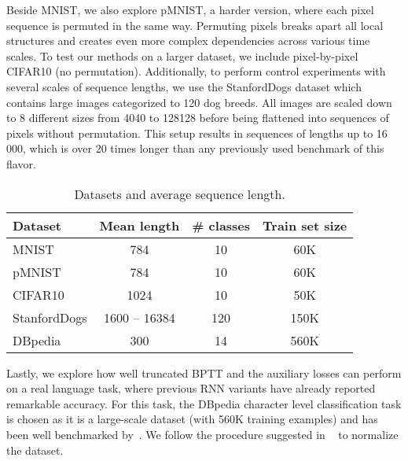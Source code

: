 \documentclass{article}
\begin{document}
Beside MNIST, we also explore pMNIST, a harder version, where each pixel sequence is permuted in the same way. Permuting pixels breaks apart all local structures and creates even more complex dependencies across various time scales. To test our methods on a larger dataset, we include pixel-by-pixel CIFAR10 (no permutation). Additionally, to perform control experiments with several scales of sequence lengths, we use the StanfordDogs dataset \citep{stanforddogs} which contains large images categorized to 120 dog breeds. All images are scaled down to 8 different sizes from 4040 to 128128 before being flattened into sequences of pixels without permutation. This setup results in sequences of lengths up to 16\,000, which is over 20 times longer than any previously used benchmark of this flavor.





\begin{table}[]
\caption{Datasets and average sequence length.}
\label{image_statistics}
\vskip 0.15in
\begin{center}
\begin{small}
\small
\begin{tabular}{lccc}
\toprule
Dataset & Mean length & \# classes & Train set size\\
\midrule
MNIST     & 784 &  10 & 60K\\
pMNIST  & 784 & 10 & 60K\\
CIFAR10 & 1024 & 10 & 50K\\
StanfordDogs\footnotemark  & 1600 -- 16384 & 120 & 150K\\
DBpedia & 300 & 14 & 560K\\
\bottomrule
\end{tabular}

\end{small}
\end{center}
\vskip -0.1in
\end{table}



Lastly, we explore how well truncated BPTT and the auxiliary losses can perform on a real language task, where previous RNN variants have already reported remarkable accuracy. For this task, the DBpedia character level classification task is chosen as it is a large-scale dataset (with 560K training examples) and has been well benchmarked by~\citet{dai2015semi}.
We follow the procedure suggested in ~\citet{zhang2015text} to normalize the dataset.
\end{document}
